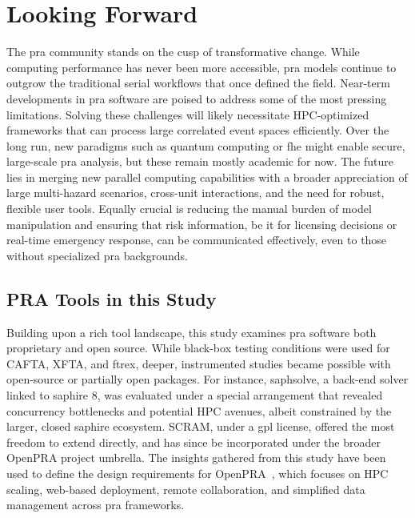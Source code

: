 \section{Looking Forward}
The \acrshort{pra} community stands on the cusp of transformative change. While computing performance has never been more accessible, \acrshort{pra} models continue to outgrow the traditional serial workflows that once defined the field. Near-term developments in \acrshort{pra} software are poised to address some of the most pressing limitations. Solving these challenges will likely necessitate HPC-optimized frameworks that can process large correlated event spaces efficiently. Over the long run, new paradigms such as quantum computing or \acrfull{fhe} might enable secure, large-scale \acrshort{pra} analysis, but these remain mostly academic for now. The future lies in merging new parallel computing capabilities with a broader appreciation of large multi-hazard scenarios, cross-unit interactions, and the need for robust, flexible user tools. Equally crucial is reducing the manual burden of model manipulation and ensuring that risk information, be it for licensing decisions or real-time emergency response, can be communicated effectively, even to those without specialized \acrshort{pra} backgrounds.

\subsection{PRA Tools in this Study}

Building upon a rich tool landscape, this study examines \acrshort{pra} software both proprietary and open source. While black-box testing conditions were used for CAFTA, XFTA, and \acrshort{ftrex}, deeper, instrumented studies became possible with open-source or partially open packages. For instance, \acrshort{saphsolve}, a back-end solver linked to \acrshort{saphire} 8, was evaluated under a special arrangement that revealed concurrency bottlenecks and potential HPC avenues, albeit constrained by the larger, closed \acrshort{saphire} ecosystem. SCRAM, under a \acrshort{gpl} license, offered the most freedom to extend directly, and has since be incorporated under the broader OpenPRA project umbrella. The insights gathered from this study have been used to define the design requirements for OpenPRA~\cite{openpra_initiative_openpra_2024}, which focuses on HPC scaling, web-based deployment, remote collaboration, and simplified data management across \acrshort{pra} frameworks.



